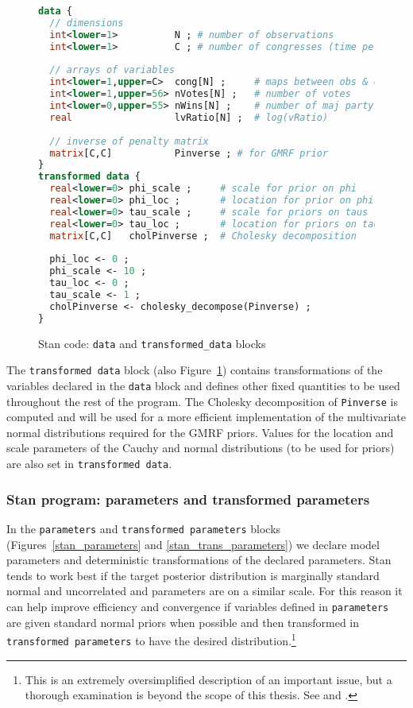 \begin{figure}[h]
\begin{lstlisting}[language=Stan, frame=trBL]
data {
  // dimensions 
  int<lower=1>          N ; # number of observations 
  int<lower=1>          C ; # number of congresses (time periods)
  
  // arrays of variables 
  int<lower=1,upper=C>  cong[N] ;     # maps between obs & congress
  int<lower=1,upper=56> nVotes[N] ;   # number of votes
  int<lower=0,upper=55> nWins[N] ;    # number of maj party victories
  real                  lvRatio[N] ;  # log(vRatio)
  
  // inverse of penalty matrix 
  matrix[C,C]           Pinverse ; # for GMRF prior
}
transformed data {
  real<lower=0> phi_scale ;     # scale for prior on phi
  real<lower=0> phi_loc ;       # location for prior on phi
  real<lower=0> tau_scale ;     # scale for priors on taus
  real<lower=0> tau_loc ;       # location for priors on taus
  matrix[C,C]   cholPinverse ;  # Cholesky decomposition 
  
  phi_loc <- 0 ;
  phi_scale <- 10 ;
  tau_loc <- 0 ;
  tau_scale <- 1 ;
  cholPinverse <- cholesky_decompose(Pinverse) ;
}
\end{lstlisting}
\caption{Stan code: {\tt data} and {\tt transformed\_data} blocks}
\label{stan_data}
\end{figure}



The {\tt transformed data} block (also Figure~\ref{stan_data}) contains transformations of the 
variables declared in the {\tt data} block and defines other fixed quantities to be used throughout 
the rest of the program. The Cholesky decomposition of {\tt Pinverse} is 
computed and will be used for a more efficient implementation of the multivariate normal distributions 
required for the GMRF priors. Values for the location and scale parameters of the Cauchy and 
normal distributions (to be used for priors) are also set in {\tt transformed data}. 


\subsubsection{Stan program: parameters and transformed parameters}

In the {\tt parameters} and {\tt transformed parameters} blocks 
(Figures~\ref{stan_parameters} and \ref{stan_trans_parameters})
we declare model parameters and deterministic transformations of the declared parameters. 
Stan tends to work best if the target posterior distribution is marginally standard normal and 
uncorrelated and parameters are on a similar scale. For this reason it can help improve 
efficiency and convergence if variables defined in {\tt parameters} are given standard normal 
priors when possible and then transformed in {\tt transformed parameters} to have the desired 
distribution.\footnote{This is an extremely oversimplified description of an important issue, but 
a thorough examination is beyond the scope of this thesis. See  
and .} 

